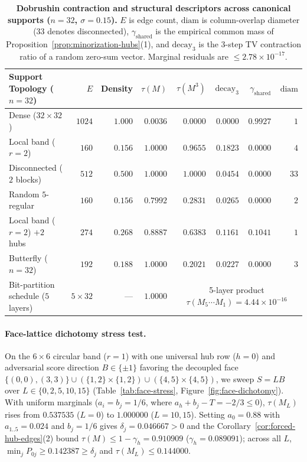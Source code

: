 \documentclass[10pt]{article}
\begin{document}
\begin{table}[t]
  \centering
  \small
  \caption{\textbf{Dobrushin contraction and structural descriptors across canonical supports ($n=32$, $\sigma=0.15$).} $E$ is edge count, $\mathrm{diam}$ is column-overlap diameter ($33$ denotes disconnected), $\gamma_{\mathrm{shared}}$ is the empirical common mass of Proposition~\ref{prop:minorization-hubs}(1), and $\mathrm{decay}_3$ is the 3-step TV contraction ratio of a random zero-sum vector. Marginal residuals are $\le 2.78 \times 10^{-17}$.}
  \label{tab:canonical-supports}
  \begin{tabular}{@{}lrrrrrrr@{}}
    \toprule
    Support Topology ($n=32$) & $E$ & Density & $\tau(M)$ & $\tau(M^3)$ & $\mathrm{decay}_3$ & $\gamma_{\mathrm{shared}}$ & $\mathrm{diam}$ \\
    \midrule
    Dense ($32\times 32$) & $1024$ & $1.000$ & $0.0036$ & $0.0000$ & $0.0000$ & $0.9927$ & $1$ \\
    Local band ($r=2$) & $160$ & $0.156$ & $1.0000$ & $0.9655$ & $0.1823$ & $0.0000$ & $4$ \\
    Disconnected ($2$ blocks) & $512$ & $0.500$ & $1.0000$ & $1.0000$ & $0.0454$ & $0.0000$ & $33$ \\
    Random $5$-regular & $160$ & $0.156$ & $0.7992$ & $0.2831$ & $0.0265$ & $0.0000$ & $2$ \\
    Local band ($r=2$) $+ 2$ hubs & $274$ & $0.268$ & $0.8887$ & $0.6383$ & $0.1161$ & $0.1041$ & $1$ \\
    Butterfly ($n=32$) & $192$ & $0.188$ & $1.0000$ & $0.2021$ & $0.0227$ & $0.0000$ & $3$ \\
    Bit-partition schedule ($5$ layers) & $5 \times 32$ & --- & $1.0000$ & \multicolumn{4}{c}{5-layer product $\tau(M_5\cdots M_1) = 4.44 \times 10^{-16}$} \\
    \bottomrule
  \end{tabular}
\end{table}

\paragraph{Face-lattice dichotomy stress test.}
On the $6\times 6$ circular band ($r=1$) with one universal hub row ($h=0$) and adversarial score direction $B \in \{\pm 1\}$ favoring the decoupled face $\{(0,0), (3,3)\} \cup (\{1,2\}\times\{1,2\}) \cup (\{4,5\}\times\{4,5\})$, we sweep $S = LB$ over $L \in \{0, 2, 5, 10, 15\}$ (Table~\ref{tab:face-stress}, Figure~\ref{fig:face-dichotomy}). With uniform marginals ($a_i = b_j = 1/6$, where $a_h + b_j - T = -2/3 \le 0$), $\tau(M_L)$ rises from $0.537535$ ($L=0$) to $1.000000$ ($L=10, 15$). Setting $a_0 = 0.88$ with $a_{1..5} = 0.024$ and $b_j = 1/6$ gives $\delta_j = 0.046667 > 0$ and the Corollary~\ref{cor:forced-hub-edges}(2) bound $\tau(M) \le 1 - \gamma_h = 0.910909$ ($\gamma_h = 0.089091$); across all $L$, $\min_j P_{0j} \ge 0.142387 \ge \delta_j$ and $\tau(M_L) \le 0.144000$.
\end{document}
